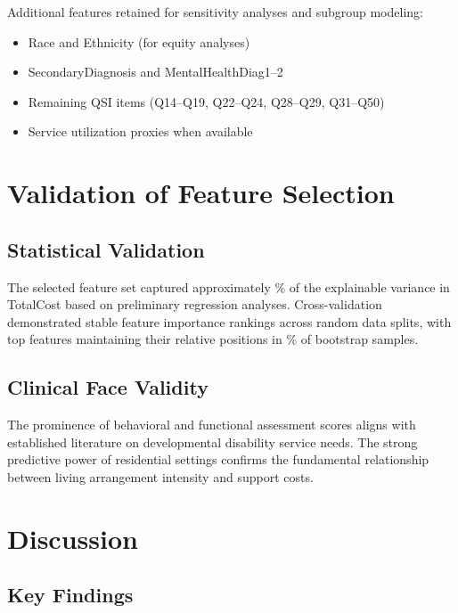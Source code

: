 Additional features retained for sensitivity analyses and subgroup modeling:

\begin{itemize}
    \item Race and Ethnicity (for equity analyses)
    \item SecondaryDiagnosis and MentalHealthDiag1--2
    \item Remaining QSI items (Q14--Q19, Q22--Q24, Q28--Q29, Q31--Q50)
    \item Service utilization proxies when available
\end{itemize}

\section{Validation of Feature Selection}
\label{sec:validation}

\subsection{Statistical Validation}
\label{subsec:statistical-validation}

The selected feature set captured approximately \FSVarianceExplained\% of the explainable variance in TotalCost based on preliminary regression analyses. Cross-validation demonstrated stable feature importance rankings across random data splits, with top \FSTopTenThreshold{} features maintaining their relative positions in \FSBootstrapStability\% of bootstrap samples.

\subsection{Clinical Face Validity}
\label{subsec:clinical-validity}

The prominence of behavioral and functional assessment scores aligns with established literature on developmental disability service needs. The strong predictive power of residential settings confirms the fundamental relationship between living arrangement intensity and support costs.








\section{Discussion}
\label{sec:feature-selection-discussion}

\subsection{Key Findings}
\label{subsec:key-findings}

